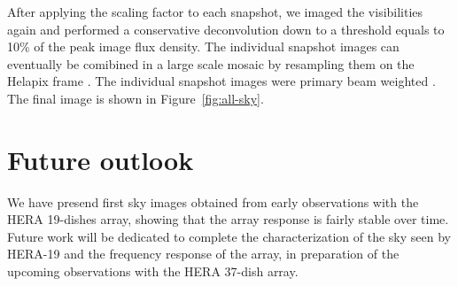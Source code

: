 \documentclass[a0,portrait]{a0poster}
\begin{document}
\begin{multicols}{2}
\noindent
After applying the scaling factor to each snapshot, we imaged the visibilities again and performed a conservative deconvolution down to a threshold equals to 10\% of the peak image flux density. The individual snapshot images can eventually be comibined in a large scale mosaic by resampling them on the Helapix frame \citep{gorski2005healpix}. The individual snapshot images were primary beam weighted \citep{ord2010interferometric}. The final image is shown in Figure~\ref{fig:all-sky}.

\section*{Future outlook}
We have presend first sky images obtained from early observations with the HERA 19-dishes array, showing that the array response is fairly stable over time. Future work will be dedicated to complete the characterization of the sky seen by HERA-19 and the frequency response of the array, in preparation of the upcoming observations with the HERA 37-dish array.



\end{multicols}
\end{document}
